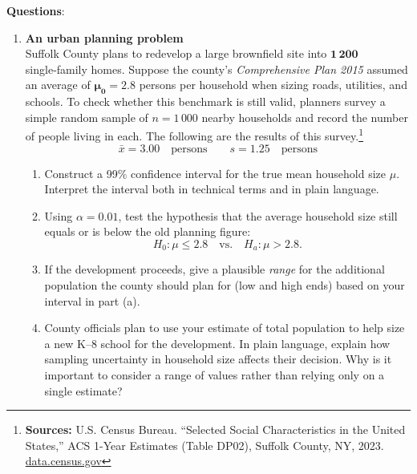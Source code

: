 \documentclass{article}
\begin{document}
\textbf{Questions}:
\begin{enumerate} %

\item \textbf{An urban planning problem} \\
Suffolk County plans to redevelop a large brownfield site into \(\mathbf{1\,200}\) single‑family homes.  
Suppose the county’s \emph{Comprehensive Plan 2015} assumed an average of \(\boldsymbol{\mu_0 = 2.8}\) persons per household when sizing roads, utilities, and schools.  
To check whether this benchmark is still valid, planners survey a simple random sample of \(n = 1\,000\) nearby households and record the number of people living in each. The following are the results of this survey.\footnote{\textbf{Sources:} U.S. Census Bureau. “Selected Social Characteristics in the United States,” ACS 1-Year Estimates (Table DP02), Suffolk County, NY, 2023. \href{https://data.census.gov/table/ACSDP1Y2023.DP02?q=DP02&g=050XX00US36103&d=ACS+1-Year+Estimates+Data+Profiles}{data.census.gov}}
\[
\bar{x}=3.00 \quad\text{persons}\qquad
s = 1.25 \quad\text{persons}
\]
\begin{enumerate}[label=(\alph*)]
  \item Construct a 99\% confidence interval for the true mean household size \(\mu\). Interpret the interval both in technical terms and in plain language.
  \item Using \(\alpha = 0.01\), test the hypothesis that the average household size still equals or is below the old planning figure:  
        \[
           H_0\!: \mu \le 2.8
           \quad\text{vs.}\quad
           H_a\!: \mu > 2.8.
        \]
  \item If the development proceeds, give a plausible \emph{range} for the additional population the county should plan for (low and high ends) based on your interval in part (a).
  \item County officials plan to use your estimate of total population to help size a new K–8 school for the development. In plain language, explain how sampling uncertainty in household size affects their decision. Why is it important to consider a range of values rather than relying only on a single estimate?
\end{enumerate}


\end{enumerate}
\end{document}
